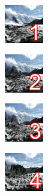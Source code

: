 \documentclass[11pt, a4paper]{article}
\begin{document}
\newpage







\taskeleven

\begin{task}
    \begin{gridlayout}{\textwidth}{12cm}
        \begin{row}{0.33}
            \begin{cell}{0.25}
                \centering
                \includegraphics[width=0.9\cellwidth]{img/thumbnail-1.png}
            \end{cell}
            \begin{cell}{0.25}
                \centering
                \includegraphics[width=0.9\cellwidth]{img/thumbnail-2.png}
            \end{cell}
            \begin{cell}{0.25}
                \centering
                \includegraphics[width=0.9\cellwidth]{img/thumbnail-3.png}
            \end{cell}
            \begin{cell}{0.25}
                \centering
                \includegraphics[width=0.9\cellwidth]{img/thumbnail-4.png}
            \end{cell}
        \end{row}
        \begin{row}{0.33}

\end{row}
\end{gridlayout}
\end{task}
\end{document}
